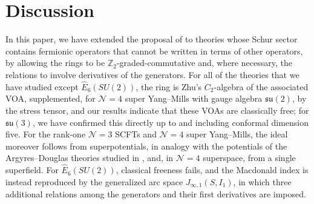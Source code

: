 \documentclass[12pt]{article}
\numberwithin{equation}{section}
\numberwithin{figure}{section}
\theoremstyle{plain}
\theoremstyle{definition}
\begin{document}
\section{Discussion}\label{sec:disc}

In this paper, we have extended the proposal of \cite{Kang:2025zub,Kang:2026nge,Kang:2026ona,Kang:2026ney,Kang:2026jnv} to theories whose Schur sector contains fermionic operators that cannot be written in terms of other operators, by allowing the rings to be $\mathbb{Z}_2$-graded-commutative and, where necessary, the relations to involve derivatives of the generators. For all of the theories that we have studied except $\widehat{E}_6(SU(2))$, the ring is Zhu's $C_2$-algebra of the associated VOA, supplemented, for $\mathcal{N}=4$ super Yang--Mills with gauge algebra $\mathfrak{su}(2)$, by the stress tensor, and our results indicate that these VOAs are classically free; for $\mathfrak{su}(3)$, we have confirmed this directly up to and including conformal dimension five. For the rank-one $\mathcal{N}=3$ SCFTs and $\mathcal{N}=4$ super Yang--Mills, the ideal moreover follows from superpotentials, in analogy with the potentials of the Argyres--Douglas theories studied in \cite{Kang:2026nge,Kang:2026ona,Kang:2026ney,Kang:2026jnv}, and, in $\mathcal{N}=4$ superspace, from a single superfield. For $\widehat{E}_6(SU(2))$, classical freeness fails, and the Macdonald index is instead reproduced by the generalized arc space $J_{\infty,1}(S, I_1)$, in which three additional relations among the generators and their first derivatives are imposed.
\end{document}
